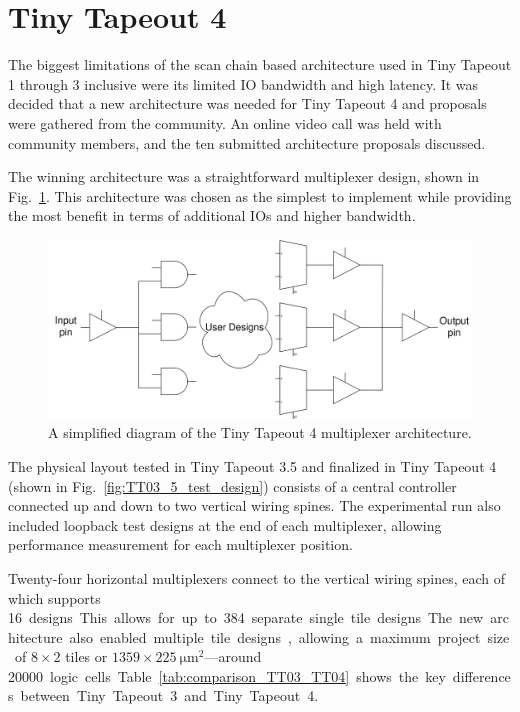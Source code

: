 \section{Tiny Tapeout 4}
\label{sec:tinytapeout4}

The biggest limitations of the scan chain based architecture used in Tiny Tapeout 1 through 3 inclusive were its limited IO bandwidth and high latency.
It was decided that a new architecture was needed for Tiny Tapeout 4 and proposals were gathered from the community.
An online video call was held with community members, and the ten submitted architecture proposals discussed.

The winning architecture was a straightforward multiplexer design, shown in Fig.~\ref{fig:multiplexer_design}. This architecture was chosen as the simplest to implement while providing the most benefit in terms of additional IOs and higher bandwidth.

\begin{figure}[!t]
\centering
\includegraphics[width=\columnwidth]{./Figs/mux architecture.png}
\caption{A simplified diagram of the Tiny Tapeout 4 multiplexer architecture.}
\label{fig:multiplexer_design}
\end{figure}

The physical layout tested in Tiny Tapeout 3.5 and finalized in Tiny Tapeout 4 (shown in Fig.~\ref{fig:TT03_5_test_design}) consists of a central controller connected up and down to two vertical wiring spines.
The experimental run also included loopback test designs at the end of each multiplexer, allowing performance measurement for each multiplexer position.

Twenty-four horizontal multiplexers connect to the vertical wiring spines, each of which supports \qty{16} designs.
This allows for up to \qty{384} separate single tile designs.
The new architecture also enabled multiple tile designs, allowing a maximum project size of $8 \times 2$ tiles or $1359 \times \qty{225}{\um\squared}$---around \qty{20000} logic cells. Table~\ref{tab:comparison_TT03_TT04} shows the key differences between Tiny Tapeout 3 and Tiny Tapeout 4.


